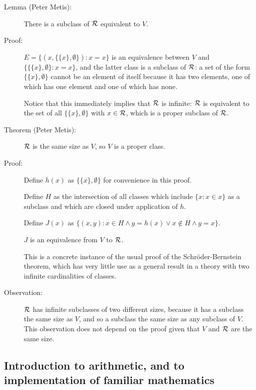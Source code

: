 \documentclass[12pt]{article}
\begin{document}
\begin{description}
\item[Lemma (Peter Metis):]  There is a subclass of $\cal R$ equivalent to $V$.

\item[Proof:]  $E = \{(x,\{\{x\},\emptyset\}):x=x\}$ is an equivalence between $V$ and $\{\{\{x\},\emptyset\}:x=x\}$, and the latter class is a subclass of $\cal R$:  a set of
the form $\{\{x\},\emptyset\}$ cannot be an element of itself because it has two elements, one of which has one element and one of which has none.

Notice that this immediately implies that $\cal R$ is infinite:  $\cal R$ is equivalent to the set of all $\{\{x\},\emptyset\}$ with $x \in \cal R$, which is a proper subclass of $\cal R$.

\item[Theorem (Peter Metis):]  $\cal R$ is the same size as $V$, so $V$ is a proper class.

\item[Proof:]  Define $h(x)$ as $\{\{x\},\emptyset\}$ for convenience in this proof.

Define $H$ as the intersection of all classes which include $\{x:x \in x\}$ as a subclass and which are closed under application of $h$.


Define $J(x)$ as $\{(x,y): x \in H \wedge y = h(x) \vee x \not\in H \wedge y=x\}$.

$J$ is an equivalence from $V$ to $\cal R$.

This is a concrete instance of the usual proof of the Schr\"oder-Bernstein theorem, which has very little use as a general result in a theory with two infinite cardinalities of classes.


\item[Observation:]  $\cal R$ has infinite subclasses of two different sizes,
because it has a subclass the same size as $V$, and so a subclass the same size as any subclass of $V$.  This observation does not depend on the proof given that $V$ and $\cal R$ are the same size.

\end{description}

\subsection{Introduction to arithmetic, and to implementation of familiar mathematics}
\end{document}
